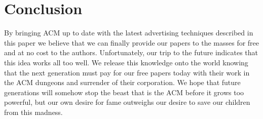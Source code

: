 \section{Conclusion}
By bringing ACM up to date with the latest advertising techniques described in
this paper we believe that we can finally provide our papers to the masses for
free and at no cost to the authors.
Unfortunately, our trip to the future indicates that this idea works all too
well.
We release this knowledge onto the world knowing that the next generation must
pay for our free papers today with their work in the ACM dungeons and surrender
of their corporation.
We hope that future generations will somehow stop the beast that is the ACM
before it grows too powerful, but our own desire for fame outweighs our desire
to save our children from this madness.
